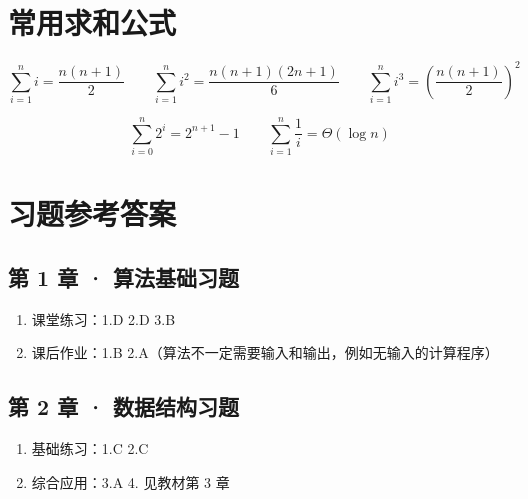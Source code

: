 \chapter{常用求和公式}

\[
\sum_{i=1}^{n} i = \frac{n(n+1)}{2}
\qquad
\sum_{i=1}^{n} i^2 = \frac{n(n+1)(2n+1)}{6}
\qquad
\sum_{i=1}^{n} i^3 = \left(\frac{n(n+1)}{2}\right)^2
\]

\[
\sum_{i=0}^{n} 2^i = 2^{n+1} - 1
\qquad
\sum_{i=1}^{n} \frac{1}{i} = \Theta(\log n)
\]

\chapter{习题参考答案}

\section*{第 1 章 · 算法基础习题}

\begin{enumerate}
    \item 课堂练习：1.D  2.D  3.B
    \item 课后作业：1.B  2.A（算法不一定需要输入和输出，例如无输入的计算程序）
\end{enumerate}

\section*{第 2 章 · 数据结构习题}

\begin{enumerate}
    \item 基础练习：1.C  2.C
    \item 综合应用：3.A  4. 见教材第 3 章
\end{enumerate}
